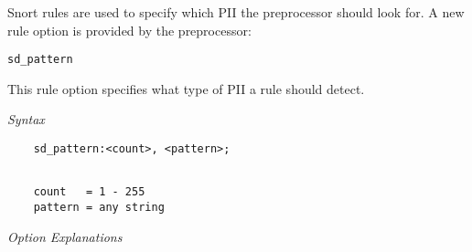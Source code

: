\documentclass[english]{report}
\begin{document}
Snort rules are used to specify which PII the preprocessor should look for.
A new rule option is provided by the preprocessor:

\begin{verbatim}
sd_pattern
\end{verbatim}

This rule option specifies what type of PII a rule should detect.

\textit{Syntax}
\begin{verbatim}
    sd_pattern:<count>, <pattern>;
\end{verbatim}
\footnotesize
\begin{verbatim}

    count   = 1 - 255
    pattern = any string
\end{verbatim}
\normalsize

\textit{Option Explanations}
\end{document}

